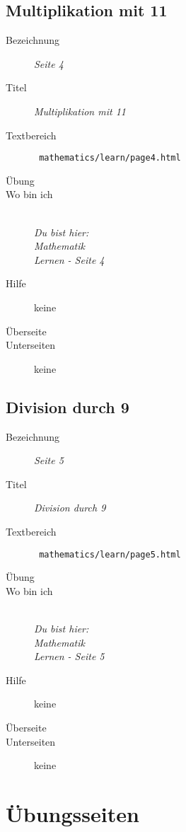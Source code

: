 \subsection{ Multiplikation mit 11 }
\label{cha:math-learn-page4}
\begin{description}
  \item[Bezeichnung] \emph{ Seite 4 }
  \item[Titel] \emph{ Multiplikation mit 11 }
  \item[Textbereich] \texttt{ mathematics/learn/page4.html }
  \item[Übung] 
  \item[Wo bin ich] \emph{\\Du bist hier:\\Mathematik\\Lernen - Seite 4 }
  \item[Hilfe] keine
  \item[Überseite] 
  \item[Unterseiten] keine
\end{description}


\subsection{ Division durch 9 }
\label{cha:math-learn-page5}
\begin{description}
  \item[Bezeichnung] \emph{ Seite 5 }
  \item[Titel] \emph{ Division durch 9 }
  \item[Textbereich] \texttt{ mathematics/learn/page5.html }
  \item[Übung] 
  \item[Wo bin ich] \emph{\\Du bist hier:\\Mathematik\\Lernen - Seite 5 }
  \item[Hilfe] keine
  \item[Überseite] 
  \item[Unterseiten] keine
\end{description}




\section{ Übungsseiten }
\label{cha:math-practise}

